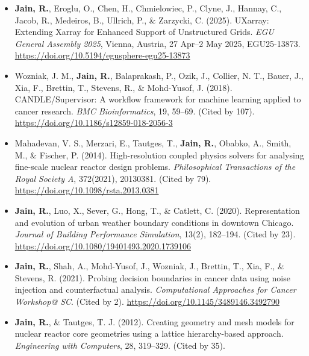\documentclass[10pt,letterpaper]{article}
\begin{document}
\begin{itemize}[leftmargin=*, itemsep=2pt]
\item \textbf{Jain, R.}, Eroglu, O., Chen, H., Chmielowiec, P., Clyne, J., Hannay, C., Jacob, R., Medeiros, B., Ullrich, P., \& Zarzycki, C. (2025). UXarray: Extending Xarray for Enhanced Support of Unstructured Grids. \textit{EGU General Assembly 2025}, Vienna, Austria, 27 Apr--2 May 2025, EGU25-13873. \href{https://doi.org/10.5194/egusphere-egu25-13873}{https://doi.org/10.5194/egusphere-egu25-13873}
    
    \item Wozniak, J. M., \textbf{Jain, R.}, Balaprakash, P., Ozik, J., Collier, N. T., Bauer, J., Xia, F., Brettin, T., Stevens, R., \& Mohd-Yusof, J. (2018). CANDLE/Supervisor: A workflow framework for machine learning applied to cancer research. \textit{BMC Bioinformatics}, 19, 59--69. (Cited by 107). \href{https://doi.org/10.1186/s12859-018-2056-3}{https://doi.org/10.1186/s12859-018-2056-3}
    
    \item Mahadevan, V. S., Merzari, E., Tautges, T., \textbf{Jain, R.}, Obabko, A., Smith, M., \& Fischer, P. (2014). High-resolution coupled physics solvers for analysing fine-scale nuclear reactor design problems. \textit{Philosophical Transactions of the Royal Society A}, 372(2021), 20130381. (Cited by 79). \href{https://doi.org/10.1098/rsta.2013.0381}{https://doi.org/10.1098/rsta.2013.0381}
    
    \item \textbf{Jain, R.}, Luo, X., Sever, G., Hong, T., \& Catlett, C. (2020). Representation and evolution of urban weather boundary conditions in downtown Chicago. \textit{Journal of Building Performance Simulation}, 13(2), 182--194. (Cited by 23). \href{https://doi.org/10.1080/19401493.2020.1739106}{https://doi.org/10.1080/19401493.2020.1739106}
    
    \item \textbf{Jain, R.}, Shah, A., Mohd-Yusof, J., Wozniak, J., Brettin, T., Xia, F., \& Stevens, R. (2021). Probing decision boundaries in cancer data using noise injection and counterfactual analysis. \textit{Computational Approaches for Cancer Workshop@ SC}. (Cited by 2). \href{https://doi.org/10.1145/3489146.3492790}{https://doi.org/10.1145/3489146.3492790}
    
    \item \textbf{Jain, R.}, \& Tautges, T. J. (2012). Creating geometry and mesh models for nuclear reactor core geometries using a lattice hierarchy-based approach. \textit{Engineering with Computers}, 28, 319--329. (Cited by 35). 
    

\end{itemize}
\end{document}
